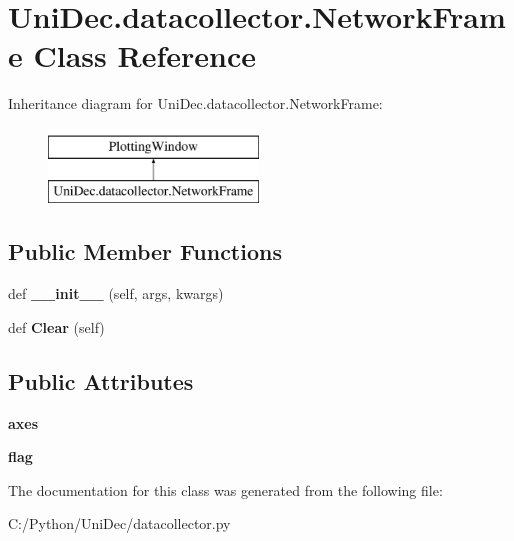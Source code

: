 \hypertarget{class_uni_dec_1_1datacollector_1_1_network_frame}{}\section{Uni\+Dec.\+datacollector.\+Network\+Frame Class Reference}
\label{class_uni_dec_1_1datacollector_1_1_network_frame}
Inheritance diagram for Uni\+Dec.\+datacollector.\+Network\+Frame\+:\begin{figure}[H]
\begin{center}
\leavevmode
\includegraphics[height=2.000000cm]{class_uni_dec_1_1datacollector_1_1_network_frame}
\end{center}
\end{figure}
\subsection*{Public Member Functions}
\begin{DoxyCompactItemize}
\item 
\hypertarget{class_uni_dec_1_1datacollector_1_1_network_frame_a21dd2d83dd2ca3ce0ba8809c83cacdb2}{}def {\bfseries \+\_\+\+\_\+init\+\_\+\+\_\+} (self, args, kwargs)\label{class_uni_dec_1_1datacollector_1_1_network_frame_a21dd2d83dd2ca3ce0ba8809c83cacdb2}

\item 
\hypertarget{class_uni_dec_1_1datacollector_1_1_network_frame_a9c012208b1afb06e863743a8ff3d0c3b}{}def {\bfseries Clear} (self)\label{class_uni_dec_1_1datacollector_1_1_network_frame_a9c012208b1afb06e863743a8ff3d0c3b}

\end{DoxyCompactItemize}
\subsection*{Public Attributes}
\begin{DoxyCompactItemize}
\item 
\hypertarget{class_uni_dec_1_1datacollector_1_1_network_frame_a4b34258aa9734e3af509f9a076afc459}{}{\bfseries axes}\label{class_uni_dec_1_1datacollector_1_1_network_frame_a4b34258aa9734e3af509f9a076afc459}

\item 
\hypertarget{class_uni_dec_1_1datacollector_1_1_network_frame_a76bf3c0e2c4c04b52b1fbce894ded65e}{}{\bfseries flag}\label{class_uni_dec_1_1datacollector_1_1_network_frame_a76bf3c0e2c4c04b52b1fbce894ded65e}

\end{DoxyCompactItemize}


The documentation for this class was generated from the following file\+:\begin{DoxyCompactItemize}
\item 
C\+:/\+Python/\+Uni\+Dec/datacollector.\+py\end{DoxyCompactItemize}
